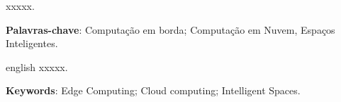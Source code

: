 \begin{resumo}

xxxxx.

\textbf{Palavras-chave}: Computação em borda; Computação em Nuvem, Espaços Inteligentes.
\end{resumo}

\begin{resumo}[Abstract]
 \begin{otherlanguage*}{english}
   \noindent xxxxx.
   
   \textbf{Keywords}: Edge Computing; Cloud computing; Intelligent Spaces.
 \end{otherlanguage*}
\end{resumo}